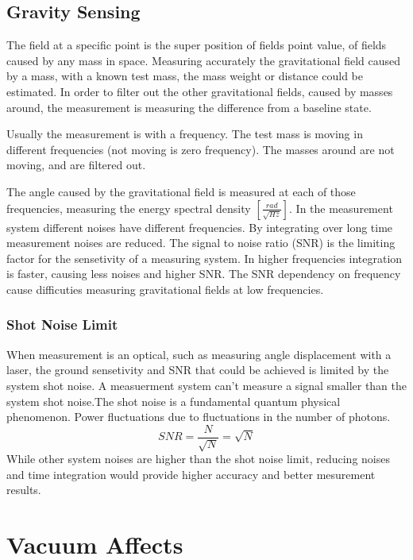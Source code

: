\documentclass[\main/master.tex]{subfiles}
\begin{document}
\subsection{Gravity Sensing}
The field at a specific point is the super position of fields point value, of fields caused by any mass in space. Measuring accurately the gravitational field caused by a mass, with a known test mass, the mass weight or distance could be estimated. In order to filter out the other gravitational fields, caused by masses around, the measurement is measuring the difference from a baseline state.
\par
Usually the measurement is with a frequency. The test mass is moving in different frequencies (not moving is zero frequency). The masses around are not moving, and are filtered out.
\par
The angle caused by the gravitational field is measured at each of those frequencies, measuring the energy spectral density $[\frac{rad}{\sqrt{Hz}}]$.
In the measurement system different noises have different frequencies. By integrating over long time measurement noises are reduced. The signal to noise ratio (SNR) is the limiting factor for the sensetivity of a measuring system. In higher frequencies integration is faster, causing less noises and higher SNR.
The SNR dependency on frequency cause difficuties measuring gravitational fields at low frequencies.

\subsubsection{Shot Noise Limit}
When measurement is an optical, such as measuring angle displacement with a laser, the ground sensetivity and SNR that could be achieved is limited by the system shot noise. A measuerment system can't measure a signal smaller than the system shot noise.The shot noise is a fundamental quantum physical phenomenon. Power fluctuations due to fluctuations in the number of photons. 
\begin{equation}
SNR = \frac{N}{\sqrt{N}} = \sqrt{N}    \label{eqn:shot_noise}
\end{equation}
While other system noises are higher than the shot noise limit, reducing noises and time integration would provide higher accuracy and better mesurement results. 


\section{Vacuum Affects}
\end{document}
